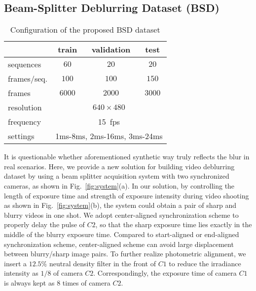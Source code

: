 \documentclass[twocolumn]{svjour3}          \smartqed  \usepackage{graphicx}
\begin{document}
\subsection{Beam-Splitter Deblurring Dataset (BSD)}

\begin{table}[b]
	\caption{Configuration of the proposed BSD dataset}
	\label{table:bsd_config}
	\begin{center}
		\begin{tabular}{lccc}
			\toprule
			&  train & validation & test\\
\midrule
			sequences& $60$ & $20$ & $20$\\
frames/seq.& $100$  & $100$ & $150$\\
frames& $6000$  & $2000$ & $3000$\\
resolution& \multicolumn{3}{c}{$640\times480$}\\
frequency& \multicolumn{3}{c}{\SI{15}{fps}}\\
settings& \multicolumn{3}{c}{1ms-8ms, 2ms-16ms, 3ms-24ms}\\
			\bottomrule
		\end{tabular}
	\end{center}
\end{table}

It is questionable whether aforementioned synthetic way truly reflects the blur in real scenarios. Here, we provide a new solution for building video deblurring dataset by using a beam splitter acquisition system with two synchronized cameras, as shown in Fig.~\ref{fig:system}(a). In our solution, by controlling the length of exposure time and strength of exposure intensity during video shooting as shown in Fig.~\ref{fig:system}(b), the system could obtain a pair of sharp and blurry videos in one shot. We adopt center-aligned synchronization scheme to properly delay the pulse of $C2$, so that the sharp exposure time lies exactly in the middle of the blurry exposure time. Compared to start-aligned or end-aligned synchronization scheme, center-aligned scheme can avoid large displacement between blurry/sharp image pairs. To further realize photometric alignment, we insert a $12.5\%$ neutral density filter in the front of $C1$ to reduce the irradiance intensity as $1/8$ of camera $C2$. Correspondingly, the exposure time of camera $C1$ is always kept as $8$ times of camera $C2$.
\end{document}
